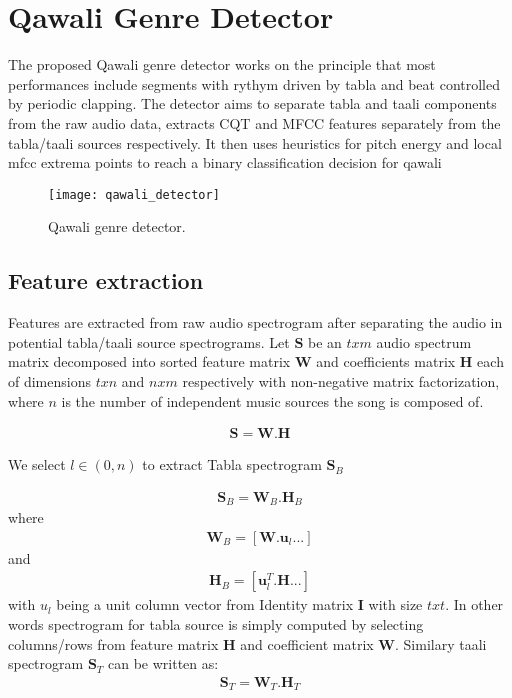 \documentclass{article}
\begin{document}
\section{Qawali Genre Detector}\label{sec:detector}

The proposed Qawali genre detector works on the principle that most performances include segments with rythym driven by tabla and beat controlled by periodic clapping. The detector aims to separate tabla and taali components from the raw audio data, extracts CQT and MFCC features separately from the tabla/taali sources respectively. It then uses heuristics for pitch energy and local mfcc extrema points to reach a binary classification decision for qawali
\begin{figure}[htbp]
  \centering
  \texttt{[image: qawali\_detector]}
  \caption{Qawali genre detector.}
\label{fig:figure}
\end{figure}

\subsection{Feature extraction}
Features are extracted from raw audio spectrogram after separating the audio in potential tabla/taali source spectrograms. Let $\boldsymbol{S}$ be an $txm$ audio spectrum matrix decomposed into sorted feature matrix $\boldsymbol{W}$ and coefficients matrix $\boldsymbol{H}$ each of dimensions $txn$ and $nxm$ respectively with non-negative matrix factorization, where $n$ is the number of independent music sources the song is composed of.

\begin{align}\label{eq:eq}
\boldsymbol{S} = \boldsymbol{W}.\boldsymbol{H}
\end{align}

We select $l \in (0,n)$ to extract Tabla spectrogram $\boldsymbol{S}_{B}$ 

\begin{align}\label{eq:eq}
\boldsymbol{S}_{B} = \boldsymbol{W}_{B}.\boldsymbol{H}_{B}
\end{align}
where
\begin{align}\label{eq:eq}
\boldsymbol{W}_{B} = [\boldsymbol{W}.\boldsymbol{u}_{l} ...]
\end{align}
and 
\begin{align}\label{eq:eq}
\boldsymbol{H}_{B} = [\boldsymbol{u}_{l}^T.\boldsymbol{H} ...]
\end{align}
with $u_{l}$ being a unit column vector from Identity matrix $\boldsymbol{I}$ with size $txt$. In other words spectrogram for tabla source is simply computed
by selecting columns/rows from feature matrix $\boldsymbol{H}$ and coefficient matrix $\boldsymbol{W}$. Similary taali spectrogram $\boldsymbol{S}_{T}$ can be written as:
\begin{align}\label{eq:eq}
\boldsymbol{S}_{T} = \boldsymbol{W}_{T}.\boldsymbol{H}_{T}
\end{align}
\end{document}
